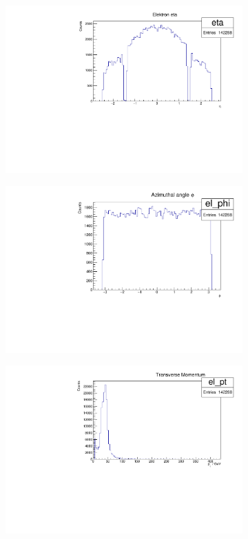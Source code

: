 \documentclass[11pt,a4paper,notitlepage]{scrartcl}
\begin{document}
\begin{figure}[t]
	\centering
	\begin{subfigure}{.49\linewidth}
		\includegraphics[width=\linewidth]{calibration/el_eta_full}
		\subcaption{}
	\end{subfigure}
	\begin{subfigure}{.49\linewidth}
		\includegraphics[width=\linewidth]{calibration/el_phi_full}
		\subcaption{}
	\end{subfigure}
	\begin{subfigure}{.49\linewidth}
		\includegraphics[width=\linewidth]{calibration/el_pt_full}

\end{subfigure}
\end{figure}
\end{document}

